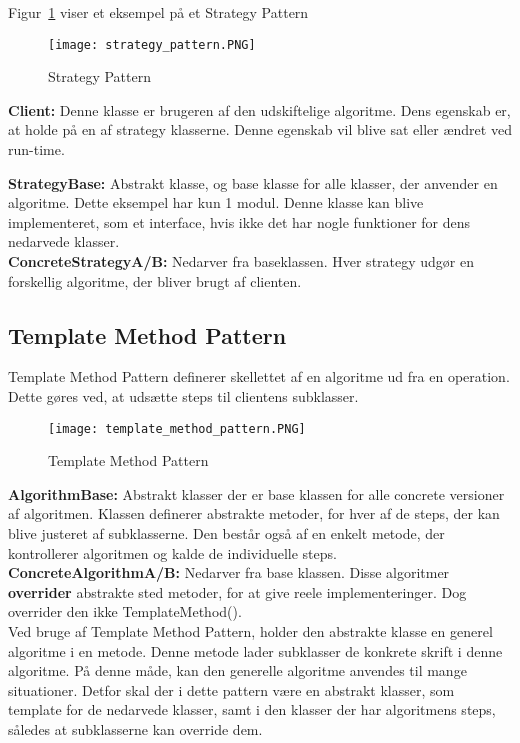 \documentclass[../SWD_disp.tex]{subfiles}
\begin{document}
Figur~\ref{fig:strategy_pattern} viser et eksempel på et Strategy Pattern

\begin{figure}[H]
    \centering
    \texttt{[image: strategy\_pattern.PNG]}
    \caption{Strategy Pattern}
    \label{fig:strategy_pattern}
\end{figure}

\textbf{Client:} Denne klasse er brugeren af den udskiftelige algoritme. Dens egenskab er, at holde på en af strategy klasserne. Denne egenskab vil blive sat eller ændret ved run-time.

\textbf{StrategyBase:} Abstrakt klasse, og base klasse for alle klasser, der anvender en algoritme. Dette eksempel har kun 1 modul. Denne klasse kan blive implementeret, som et interface, hvis ikke det har nogle funktioner for dens nedarvede klasser.
\\

\textbf{ConcreteStrategyA/B:} Nedarver fra baseklassen. Hver strategy udgør en forskellig algoritme, der bliver brugt af clienten.

\subsection*{Template Method Pattern}
Template Method Pattern definerer skellettet af en algoritme ud fra en operation. Dette gøres ved, at udsætte steps til clientens subklasser.

\begin{figure}[H]
    \centering
    \texttt{[image: template\_method\_pattern.PNG]}
    \caption{Template Method Pattern}
    \label{fig:template_method_pattern}
\end{figure}

\textbf{AlgorithmBase:} Abstrakt klasser der er base klassen for alle concrete versioner af algoritmen. Klassen definerer abstrakte metoder, for hver af de steps, der kan blive justeret af subklasserne. Den består også af en enkelt metode, der kontrollerer algoritmen og kalde de individuelle steps.
\\

\textbf{ConcreteAlgorithmA/B:} Nedarver fra base klassen. Disse algoritmer \textbf{overrider} abstrakte sted metoder, for at give reele implementeringer. Dog overrider den ikke TemplateMethod().
\\

Ved bruge af Template Method Pattern, holder den abstrakte klasse en generel algoritme i en metode. Denne metode lader subklasser de konkrete skrift i denne algoritme. På denne måde, kan den generelle algoritme anvendes til mange situationer. Detfor skal der i dette pattern være en abstrakt klasser, som template for de nedarvede klasser, samt i den klasser der har algoritmens steps, således at subklasserne kan override dem.
\end{document}

